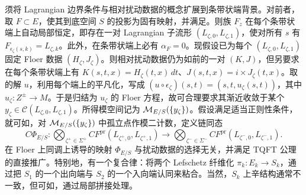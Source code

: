 须将 Lagrangian 边界条件与相对扰动数据的概念扩展到条带状端背景。对前者，取 $F\subset E$，使其到底空间 $S$ 的投影为固有映射，并满足。则族 $F_z$ 在每个条带状端上自动局部恒定，即存在一对 Lagrangian 子流形 $(L_{\zeta,0},L_{\zeta,1})$，使对所有 $s$ 有 $F_{\epsilon_\zeta(s,k)}=L_{\zeta,k}$。此外，在条带状端上必有 $\alpha_F=0$。现假设已为每个 $(L_{\zeta,0},L_{\zeta,1})$ 固定 Floer 数据 $(H_\zeta,J_\zeta)$。则相对扰动数据仍为如前的一对 $(K,J)$，但另要求在每个条带状端上有 $K(s,t,x)=H_\zeta(t,x)\,dt$、$J(s,t,x)=i\times J_\zeta(t,x)$。取的解 $u$，利用每个端上的平凡化，写成 $(u\circ\epsilon_\zeta)(s,t)=(s,t,u_\zeta(s,t))$，其中 $u_\zeta:Z^\pm\to M$。于是归结为 $u_\zeta$ 的 Floer 方程，故可合理要求其渐近收敛于某个 $y_\zeta\in\mathcal C(L_{\zeta,0},L_{\zeta,1})$。所得模空间记为 $\mathcal M_{E/S}(\{y_\zeta\})$。假设满足适当正则性条件，就可如，对 $\mathcal M_{E/S}(\{y_\zeta\})$ 中孤立点作模二计数，定义链同态
\begin{equation}\label{eq:17.10}
C\Phi_{E/S}:\bigotimes_{\zeta^+\in\Sigma^+}CF^{\mathrm{pr}}(L_{\zeta^+,0},L_{\zeta^+,1})
\longrightarrow\bigotimes_{\zeta^-\in\Sigma^-}CF^{\mathrm{pr}}(L_{\zeta^-,0},L_{\zeta^-,1}).
\end{equation}
在 Floer 上同调上诱导的映射 $\Phi_{E/S}$ 与扰动数据的选择无关，并满足 TQFT 公理的直接推广。特别地，有一个复合律：将两个 Lefschetz 纤维化 $\pi_k:E_k\to S_k$，通过把 $S_1$ 的一个出向端与 $S_2$ 的一个入向端认同来粘合。当然，$S_k$ 上辛结构通常不一致，但可如，通过局部拼接处理。

